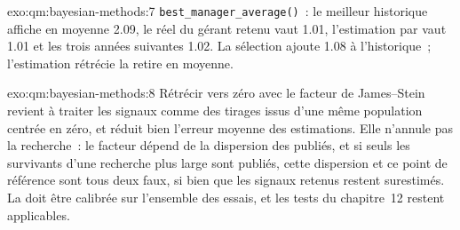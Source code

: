 \begin{solution}{exo:qm:bayesian-methods:7}
\texttt{best\_manager\_average()}~: le meilleur historique affiche en moyenne 2.09, le  réel du gérant retenu vaut 1.01, l'estimation par 
vaut 1.01 et les trois années suivantes 1.02. La sélection ajoute 1.08 à l'historique~; l'estimation rétrécie la retire en moyenne.
\end{solution}

\begin{solution}{exo:qm:bayesian-methods:8}
Rétrécir vers zéro avec le facteur de James--Stein revient à traiter les signaux comme des tirages issus d'une même population centrée en zéro, et réduit bien
l'erreur moyenne des estimations. Elle n'annule pas la recherche~: le facteur dépend de la dispersion des  publiés, et si seuls les
survivants d'une recherche plus large sont publiés, cette dispersion et ce point de référence sont tous deux faux, si bien que les signaux retenus restent surestimés. La 
doit être calibrée sur l'ensemble des essais, et les tests du chapitre~12 restent applicables.
\end{solution}

